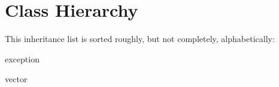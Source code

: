 \section{Class Hierarchy}
This inheritance list is sorted roughly, but not completely, alphabetically\+:\begin{DoxyCompactList}
\item exception\begin{DoxyCompactList}
\item {}
\end{DoxyCompactList}
\item vector\begin{DoxyCompactList}
\item {}
\end{DoxyCompactList}
\item {}
\end{DoxyCompactList}
